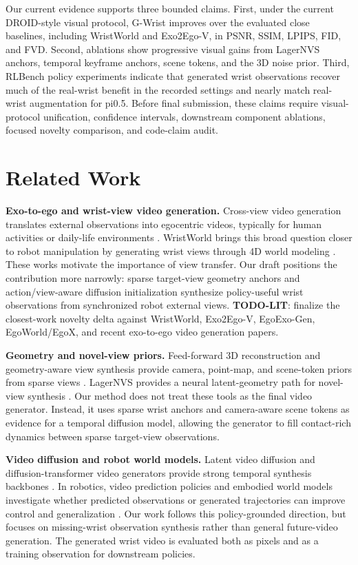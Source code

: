 \documentclass[letterpaper]{article}
\newcommand{\method}{G-Wrist}
\newcommand{\todo}[1]{\textbf{TODO-#1}}
\begin{document}
Our current evidence supports three bounded claims.
First, under the current DROID-style visual protocol, \method{} improves over the evaluated close baselines, including WristWorld and Exo2Ego-V, in PSNR, SSIM, LPIPS, FID, and FVD.
Second, ablations show progressive visual gains from LagerNVS anchors, temporal keyframe anchors, scene tokens, and the 3D noise prior.
Third, RLBench policy experiments indicate that generated wrist observations recover much of the real-wrist benefit in the recorded settings and nearly match real-wrist augmentation for pi0.5.
Before final submission, these claims require visual-protocol unification, confidence intervals, downstream component ablations, focused novelty comparison, and code-claim audit.

\section{Related Work}

\textbf{Exo-to-ego and wrist-view video generation.}
Cross-view video generation translates external observations into egocentric videos, typically for human activities or daily-life environments \cite{liu2024exo2ego,xu2025egoexogen,park2026egoworld}.
WristWorld brings this broad question closer to robot manipulation by generating wrist views through 4D world modeling \cite{qian2025wristworld}.
These works motivate the importance of view transfer.
Our draft positions the contribution more narrowly: sparse target-view geometry anchors and action/view-aware diffusion initialization synthesize policy-useful wrist observations from synchronized robot external views.
\todo{LIT}: finalize the closest-work novelty delta against WristWorld, Exo2Ego-V, EgoExo-Gen, EgoWorld/EgoX, and recent exo-to-ego video generation papers.

\textbf{Geometry and novel-view priors.}
Feed-forward 3D reconstruction and geometry-aware view synthesis provide camera, point-map, and scene-token priors from sparse views \cite{wang2024dust3r,leroy2024mastr,wang2025vggt}.
LagerNVS provides a neural latent-geometry path for novel-view synthesis \cite{szymanowicz2026lagernvs}.
Our method does not treat these tools as the final video generator.
Instead, it uses sparse wrist anchors and camera-aware scene tokens as evidence for a temporal diffusion model, allowing the generator to fill contact-rich dynamics between sparse target-view observations.

\textbf{Video diffusion and robot world models.}
Latent video diffusion and diffusion-transformer video generators provide strong temporal synthesis backbones \cite{blattmann2023svd,wan2025wan}.
In robotics, video prediction policies and embodied world models investigate whether predicted observations or generated trajectories can improve control and generalization \cite{hu2025vpp,zhen2025tesseract,jang2025dreamgen}.
Our work follows this policy-grounded direction, but focuses on missing-wrist observation synthesis rather than general future-video generation.
The generated wrist video is evaluated both as pixels and as a training observation for downstream policies.
\end{document}
